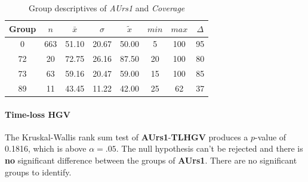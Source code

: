 \begin{table}[ht]
	\small
	\centering
    \begin{tabular}{c|c|c|c|c|c|c|c}
        \toprule
        Group & $n$ & $\bar{x}$ & $\sigma$ & $\tilde{x}$ & $min$ & $max$ & $\Delta$ \\
        \midrule
        0  & 663 & 51.10  & 20.67 & 50.00  & 5   & 100 & 95 \\ 
        72 & 20  & 72.75  & 26.16 & 87.50  & 20  & 100 & 80 \\ 
        73 & 63  & 59.16  & 20.47 & 59.00  & 15  & 100 & 85 \\ 
        89 & 11  & 43.45  & 11.22 & 42.00  & 25  & 62  & 37 \\ 
        \bottomrule
      \end{tabular}
    \caption{Group descriptives of \textit{AUrs1} and \textit{Coverage}}
    \label{tbl:descriptives_baysis_initiator_AUrs1_Cov}
\end{table}

\paragraph{Time-loss HGV}
The Kruskal-Wallis rank sum test of \textbf{AUrs1}-\textbf{TLHGV} produces a $p$-value of 0.1816, which is above $\alpha=.05$. The null hypothesis can't be rejected and there is \textbf{no} significant difference between the groups of \textbf{AUrs1}. There are no significant groups to identify.

